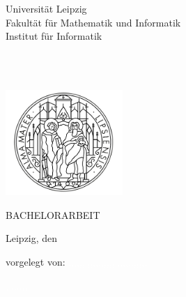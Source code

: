 \begin{titlepage}
	\begin{addmargin}[-1cm]{-3cm}
    \begin{center}
        \large

        \hfill

        \vfill
        
        Universität Leipzig\\
        Fakultät für Mathematik und Informatik\\
        Institut für Informatik\\
        
        \vfill

        \begingroup
            \color{Maroon}\LARGE{\spacedallcaps{\myTitle}} \\ \bigskip
            \large{\spacedallcaps{\mySubtitle}}\\ \bigskip
        \endgroup
        
        \vfill
        
        \includegraphics[height=4cm]{abb/uni-leipzig-logo-pur.png} \\ \medskip %
        
        \vfill

        

        {\Huge BACHELORARBEIT} \bigskip

        \vfill
        
    \end{center}

        Leipzig, den \myTime \\ \medskip
        
    \begin{flushright}
        vorgelegt von: \textcolor{white}{,,,,,,,,,,,,,,,,,,,,,,,,,,,,,} \\
        \vspace{2pt}
        
        \noindent
         \textcolor{white}{,,,,,,,,}\\ 
        \vspace{4pt}
        

\end{flushright}
\end{addmargin}
\end{titlepage}
